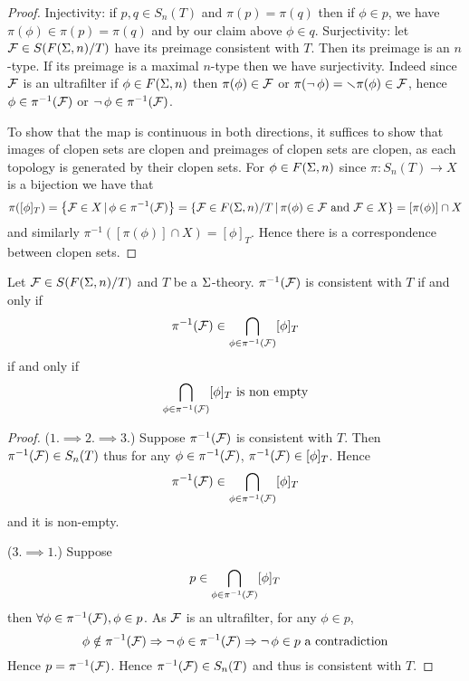 \begin{proof}
    Injectivity: if $p,q \in S_n(T)$ and $\pi(p) = \pi(q)$ then 
    if $\phi \in p$, we have $\pi(\phi) \in \pi(p) = \pi(q)$ and by our 
    claim above $\phi \in q$.
    Surjectivity: let $\mathcal{F} \in S(F(\Sigma,n) / T)$ 
    have its preimage consistent with $T$.
    Then its preimage is an $n$-type.
    If its preimage is a maximal $n$-type then we have surjectivity.
    Indeed since $\mathcal{F}$ is an ultrafilter if $\phi \in F(\Sigma,n)$ then 
    $\pi(\phi) \in \mathcal{F}$ or $\pi(\neg\, \phi) = \smallsetminus \pi(\phi) \in \mathcal{F}$,
    hence $\phi \in \pi^{-1}(\mathcal{F})$ or $\neg\, \phi \in \pi^{-1}(\mathcal{F})$.

    To show that the map is continuous in both directions,
    it suffices to show that images of clopen sets are clopen and preimages of 
    clopen sets are clopen,
    as each topology is generated by their clopen sets.
    For $\phi \in F(\Sigma,n)$ since 
    $\pi : S_n(T) \to X$ is a bijection we have that
    \[\pi([\phi]_T) = \left\{\mathcal{F} \in X \,|\, \phi \in \pi^{-1}(\mathcal{F})\right\} =
    \left\{\mathcal{F} \in F(\Sigma,n) / T \,|\, \pi(\phi) \in \mathcal{F} \text{ and } \mathcal{F} \in X\right\} = 
    [\pi(\phi)] \cap X\]
    and similarly $\pi^{-1}([\pi(\phi)] \cap X) = [\phi]_T$.
    Hence there is a correspondence between clopen sets.
\end{proof}

\begin{lem}
    Let $\mathcal{F} \in S(F(\Sigma,n) / T)$ and $T$ be a $\Sigma$-theory.
    $\pi^{-1}(\mathcal{F})$ is consistent with $T$ if and only if 
    \[\pi^{-1}(\mathcal{F}) \in \bigcap_{\phi \in \pi^{-1}(\mathcal{F})} [\phi]_T\]
    if and only if 
    \[\bigcap_{\phi \in \pi^{-1}(\mathcal{F})} [\phi]_T \text{ is non empty}\]
\end{lem}
\begin{proof}
    ($1. \implies 2. \implies 3.$)
        Suppose $\pi^{-1}(\mathcal{F})$ is consistent with $T$.
        Then $\pi^{-1}(\mathcal{F}) \in S_n(T)$ thus for any $\phi \in \pi^{-1}(\mathcal{F})$, 
        $\pi^{-1}(\mathcal{F}) \in [\phi]_T$. 
        Hence 
        \[\pi^{-1}(\mathcal{F}) \in \bigcap_{\phi \in \pi^{-1}(\mathcal{F})} [\phi]_T\]
        and it is non-empty.

    ($3. \implies 1.$)
        Suppose 
        \[p \in \bigcap_{\phi \in \pi^{-1}(\mathcal{F})} [\phi]_T\]
        then $\forall \phi \in \pi^{-1}(\mathcal{F}), \phi \in p$.
        As $\mathcal{F}$ is an ultrafilter, for any $\phi \in p$, 
        \[\phi \notin \pi^{-1}(\mathcal{F}) \Rightarrow \neg\, \phi \in \pi^{-1}(\mathcal{F}) 
        \Rightarrow \neg\, \phi \in p \text{ a contradiction}\]
        Hence $p = \pi^{-1}(\mathcal{F})$.
        Hence $\pi^{-1}(\mathcal{F}) \in S_n(T)$ and thus is consistent with $T$.
\end{proof}

